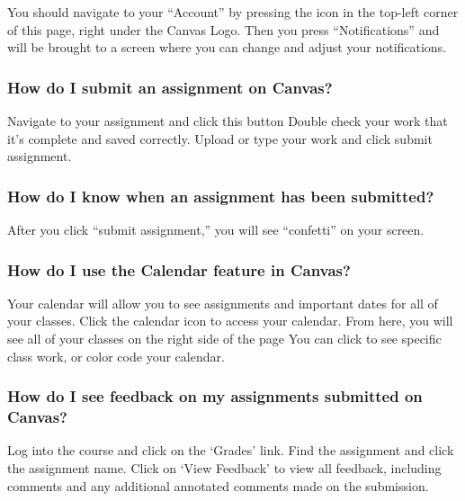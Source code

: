 You should navigate to your ``Account'' by pressing the icon in the top-left corner of this page, right under the Canvas Logo. Then you press ``Notifications'' and will be brought to a screen where you can change and adjust your notifications.

\hypertarget{how-do-i-submit-an-assignment-on-canvas}{%
\subsubsection{How do I submit an assignment on Canvas?}\label{how-do-i-submit-an-assignment-on-canvas}}

Navigate to your assignment and click this button
Double check your work that it's complete and saved correctly.
Upload or type your work and click submit assignment.

\hypertarget{how-do-i-know-when-an-assignment-has-been-submitted}{%
\subsubsection{How do I know when an assignment has been submitted?}\label{how-do-i-know-when-an-assignment-has-been-submitted}}

After you click ``submit assignment,'' you will see ``confetti'' on your screen.

\hypertarget{how-do-i-use-the-calendar-feature-in-canvas}{%
\subsubsection{How do I use the Calendar feature in Canvas?}\label{how-do-i-use-the-calendar-feature-in-canvas}}

Your calendar will allow you to see assignments and important dates for all of your classes.
Click the calendar icon to access your calendar.
From here, you will see all of your classes on the right side of the page
You can click to see specific class work, or color code your calendar.

\hypertarget{how-do-i-see-feedback-on-my-assignments-submitted-on-canvas}{%
\subsubsection{How do I see feedback on my assignments submitted on Canvas?}\label{how-do-i-see-feedback-on-my-assignments-submitted-on-canvas}}

Log into the course and click on the `Grades' link.
Find the assignment and click the assignment name.
Click on `View Feedback' to view all feedback, including comments and any additional annotated comments made on the submission.

